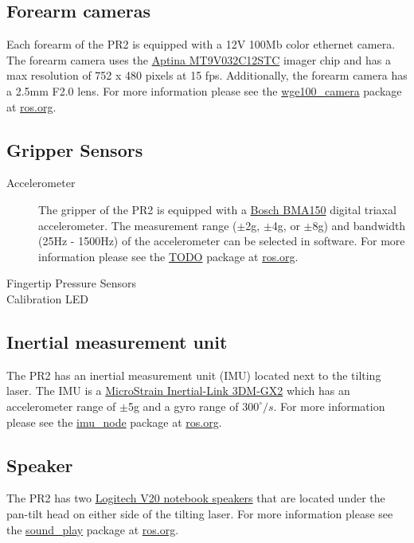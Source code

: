 \subsection{Forearm cameras}
Each forearm of the PR2 is equipped with a 12V 100Mb color ethernet camera. The forearm camera uses the 
\href{http://www.aptina.com/products/image_sensors/mt9v032c12stc/#overview}{Aptina MT9V032C12STC}  imager chip
and has a max resolution of 752 x 480 pixels at 15 fps. Additionally, the forearm camera has a 2.5mm F2.0 lens.  
For more information please see the \href{http://www.ros.org/wiki/wge100_camera}{wge100\_camera} package
at \href{http://www.ros.org}{ros.org}.

\subsection{Gripper Sensors}
\begin{description}

\item[Accelerometer]
The gripper of the PR2 is equipped with a \href{http://www.bosch-sensortec.com/content/language1/html/3474.htm}{Bosch BMA150} 
digital triaxal accelerometer. The measurement range ($\pm$2g, $\pm$4g, or $\pm$8g) and bandwidth (25Hz - 1500Hz) 
of the accelerometer can be selected in software. For more information please see the \href{http://www.ros.org/wiki/wge100_camera}{TODO} 
package at \href{http://www.ros.org}{ros.org}.

\item[Fingertip Pressure Sensors]


\item[Calibration LED]

\end{description}

\subsection{Inertial measurement unit}
The PR2 has an inertial measurement unit (IMU) located next to the tilting laser. The IMU is a 
\href{http://www.microstrain.com/3dm-gx2.aspx}{MicroStrain Inertial-Link 3DM-GX2} which has an 
accelerometer range of $\pm$5g and a gyro range of $300^\circ/s$. For more information please see 
the \href{http://www.ros.org/wiki/imu_node}{imu\_node} package at \href{http://www.ros.org}{ros.org}.

\subsection{Speaker}
The PR2 has two \href{http://www.logitech.com/index.cfm/speakers_audio/home_pc_speakers/devices/199&cl=us,en}{Logitech V20 notebook speakers} 
that are located under the pan-tilt head on either side of the tilting laser. For more information please 
see the \href{http://www.ros.org/wiki/sound_play}{sound\_play} package at \href{http://www.ros.org}{ros.org}.


